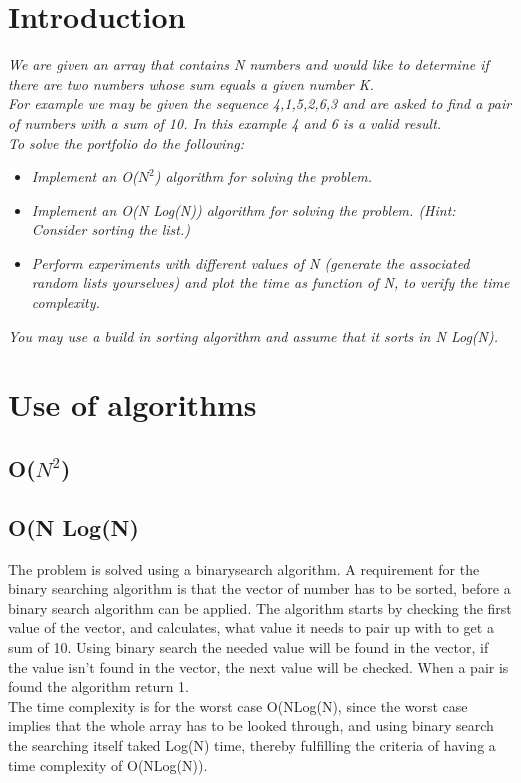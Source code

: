 \section{Introduction}
\emph{We are given an array that contains N numbers and would like to determine if there are two numbers whose sum equals a given number K.\\
For example we may be given the sequence 4,1,5,2,6,3 and are asked to find a pair of numbers with a sum of 10. In this example 4 and 6 is a valid result.\\
To solve the portfolio do the following:}
\begin{itemize}
\item \emph{Implement an O(\(N^{2}\)) algorithm for solving the problem.}
\item \emph{Implement an O(N Log(N)) algorithm for solving the problem. (Hint: Consider sorting the list.)}
\item \emph{Perform experiments with different values of N (generate the associated random lists yourselves)
and plot the time as function of N, to verify the time complexity.}
\end{itemize}
\emph{You may use a build in sorting algorithm and assume that it sorts in N Log(N).}

\section{Use of algorithms}
\subsection{O(\(N^{2}\))}
\subsection{O(N Log(N)}
The problem is solved using a binarysearch algorithm. A requirement for the binary searching algorithm is that the vector of number has to be sorted, before a binary search algorithm can be applied. 
The algorithm starts by checking the first value of the vector, and calculates, what value it needs to pair up with to get a sum of 10.  Using binary search the needed value will be found in the vector, if the value isn't found in the vector, the next value will be checked.  When a pair is found the algorithm return 1. 
\\

The time complexity is for the worst case O(NLog(N), since the worst case implies that the whole array has to be looked through, and using binary search the  searching itself taked Log(N) time, thereby fulfilling the criteria of having a time complexity of O(NLog(N)).    
\\

